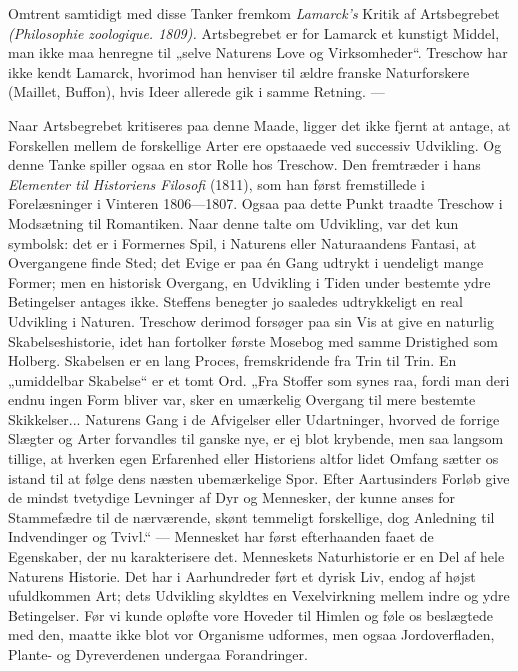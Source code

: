 \documentclass[12pt,a4paper,openany]{book}
\newcommand{\opage}[1]{\marginnote{\footnotesize\textit{[#1]}}}
\begin{document}
Omtrent samtidigt med disse Tanker fremkom \textit{Lamarck's} Kritik af
Artsbegrebet \textit{(Philosophie zoologique. 1809).} Artsbegrebet er for
Lamarck et kunstigt Middel, man ikke maa henregne til „selve Naturens Love og
Virksomheder“. Treschow har ikke kendt Lamarck, hvorimod han henviser til ældre
franske Naturforskere (Maillet, Buffon), hvis Ideer allerede gik i samme Retning. ---

Naar Artsbegrebet kritiseres paa denne Maade, ligger det ikke fjernt at antage,
at Forskellen mellem de forskellige Arter ere opstaaede ved successiv
Udvikling. Og denne Tanke spiller ogsaa en stor Rolle hos Treschow. Den
fremtræder i hans \textit{Elementer til Historiens Filosofi} (1811), som han
først fremstillede i Forelæsninger i Vinteren 1806---1807. Ogsaa paa dette
Punkt traadte Treschow i Modsætning til Romantiken. Naar denne talte om
Udvikling, var det kun symbolsk:
\setcounter{footnote}{0}%
\opage{93}det er i Formernes Spil, i Naturens eller Naturaandens Fantasi, at
Overgangene finde Sted; det Evige er paa én Gang udtrykt i uendeligt mange
Former; men en historisk Overgang, en Udvikling i Tiden under bestemte ydre
Betingelser antages ikke. Steffens benegter jo saaledes udtrykkeligt en real
Udvikling i Naturen. Treschow derimod forsøger paa sin Vis at give en naturlig
Skabelseshistorie, idet han fortolker første Mosebog med samme Dristighed som
Holberg. Skabelsen er en lang Proces, fremskridende fra Trin til Trin. En
„umiddelbar Skabelse“ er et tomt Ord. „Fra Stoffer som synes raa, fordi man
deri endnu ingen Form bliver var, sker en umærkelig Overgang til mere bestemte
Skikkelser... Naturens Gang i de Afvigelser eller Udartninger, hvorved de
forrige Slægter og Arter forvandles til ganske nye, er ej blot krybende, men
saa langsom tillige, at hverken egen Erfarenhed eller Historiens altfor lidet
Omfang sætter os istand til at følge dens næsten ubemærkelige Spor. Efter
Aartusinders Forløb give de mindst tvetydige Levninger af Dyr og Mennesker, der
kunne anses for Stammefædre til de nærværende, skønt temmeligt forskellige, dog
Anledning til Indvendinger og Tvivl.“ --- Mennesket har først efterhaanden
faaet de Egenskaber, der nu karakterisere det. Menneskets Naturhistorie er en
Del af hele Naturens Historie. Det har i Aarhundreder ført et dyrisk Liv, endog
af højst ufuldkommen Art; dets Udvikling skyldtes en Vexelvirkning mellem indre
og ydre Betingelser. Før vi kunde opløfte vore Hoveder til Himlen og føle os
beslægtede med den, maatte ikke blot vor Organisme udformes, men ogsaa
Jordoverfladen, Plante- og Dyreverdenen undergaa Forandringer.
\end{document}
